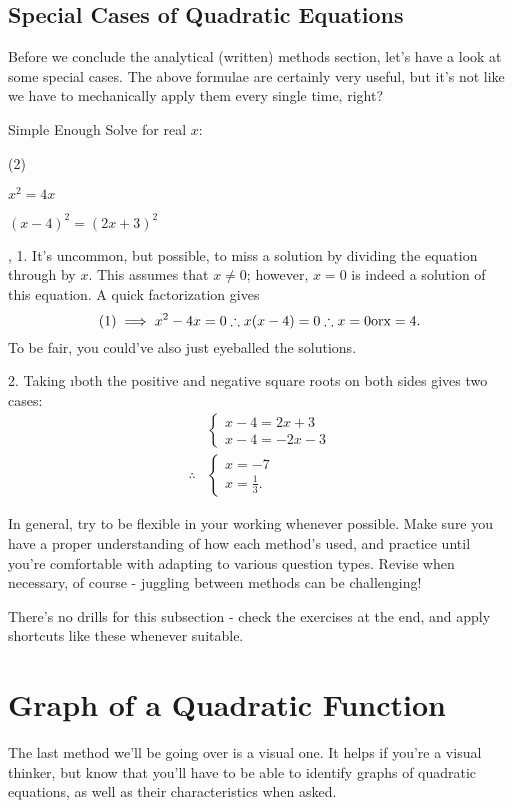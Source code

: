 \documentclass[../../main.tex]{subfiles}
\begin{document}
\subsection{Special Cases of Quadratic Equations}
Before we conclude the analytical (written) methods section, let's have a look at some special cases. The above formulae are certainly very useful, but it's not like we have to mechanically apply them every single time, right?
\begin{example}{Simple Enough}
Solve for real $x$:
\begin{question_set}(2)
    \item $x^2=4x$
    \item $(x-4)^2=(2x+3)^2$
\end{question_set}
\sep
1. It's uncommon, but possible, to miss a solution by dividing the equation through by $x$. This assumes that $x\neq0$; however, $x=0$ is indeed a solution of this equation. A quick factorization gives $$(1)\implies x^2-4x=0\therefore x(x-4)=0\therefore x=0\rm{ or } x=4.$$
To be fair, you could've also just eyeballed the solutions.

2. Taking \i{both the positive and negative} square roots on both sides gives two cases:
\begin{align}
    &\begin{cases}x-4=2x+3\\x-4=-2x-3\end{cases} \\
    \therefore&\begin{cases}x=-7\\x=\frac13.\end{cases}
\end{align}
\end{example}
In general, try to be flexible in your working whenever possible. Make sure you have a proper understanding of how each method's used, and practice until you're comfortable with adapting to various question types. Revise when necessary, of course - juggling between methods can be challenging!


There's no drills for this subsection - check the exercises at the end, and apply shortcuts like these whenever suitable.

\section{Graph of a Quadratic Function}
The last method we'll be going over is a visual one. It helps if you're a visual thinker, but know that you'll have to be able to identify graphs of quadratic equations, as well as their characteristics when asked.
\end{document}

